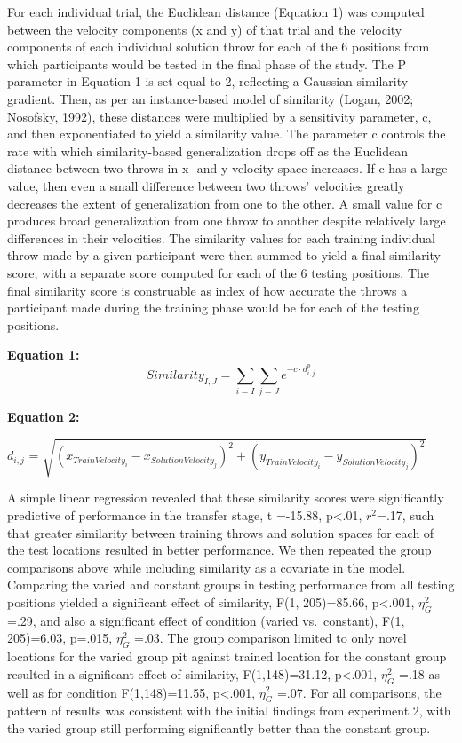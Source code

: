 \documentclass[
  jou, donotrepeattitle,floatsintext]{apa7}
\begin{document}
For each individual trial, the Euclidean distance (Equation 1) was computed between the velocity components (x and y) of that trial and the velocity components of each individual solution throw for each of the 6 positions from which participants would be tested in the final phase of the study. The P parameter in Equation 1 is set equal to 2, reflecting a Gaussian similarity gradient. Then, as per an instance-based model of similarity (Logan, 2002; Nosofsky, 1992), these distances were multiplied by a sensitivity parameter, c, and then exponentiated to yield a similarity value. The parameter c controls the rate with which similarity-based generalization drops off as the Euclidean distance between two throws in x- and y-velocity space increases. If c has a large value, then even a small difference between two throws' velocities greatly decreases the extent of generalization from one to the other. A small value for c produces broad generalization from one throw to another despite relatively large differences in their velocities. The similarity values for each training individual throw made by a given participant were then summed to yield a final similarity score, with a separate score computed for each of the 6 testing positions. The final similarity score is construable as index of how accurate the throws a participant made during the training phase would be for each of the testing positions.

\textbf{Equation 1:}
\[ Similarity_{I,J} =  \sum_{i = I}\sum_{j=J} e^{-c\cdot d^p_{i,j}} \]

\textbf{Equation 2:}

\(d_{i,j}\) = \(\sqrt{(x_{TrainVelocity_i}-x_{SolutionVelocity_j})^2 + (y_{TrainVelocity_i}-y_{SolutionVelocity_j})^2 }\)

A simple linear regression revealed that these similarity scores were significantly predictive of performance in the transfer stage, t =-15.88, p\textless.01, \(r^2\)=.17, such that greater similarity between training throws and solution spaces for each of the test locations resulted in better performance. We then repeated the group comparisons above while including similarity as a covariate in the model. Comparing the varied and constant groups in testing performance from all testing positions yielded a significant effect of similarity, F(1, 205)=85.66, p\textless.001, \(\eta^{2}_G\) =.29, and also a significant effect of condition (varied vs.~constant), F(1, 205)=6.03, p=.015, \(\eta^{2}_G\) =.03. The group comparison limited to only novel locations for the varied group pit against trained location for the constant group resulted in a significant effect of similarity, F(1,148)=31.12, p\textless.001, \(\eta^{2}_G\) =.18 as well as for condition F(1,148)=11.55, p\textless.001, \(\eta^{2}_G\) =.07. For all comparisons, the pattern of results was consistent with the initial findings from experiment 2, with the varied group still performing significantly better than the constant group.
\end{document}
